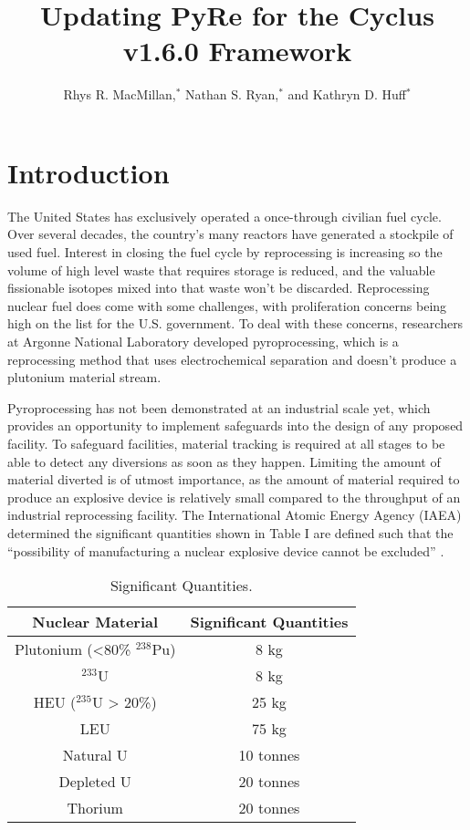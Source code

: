 \documentclass{anstrans}
\title{Updating PyRe for the Cyclus v1.6.0 Framework}
\author{Rhys R. MacMillan,$^{*}$ Nathan S. Ryan,$^{*}$ and Kathryn D. Huff$^{*}$}
\institute{
$^{*}$Advanced Reactors and Fuel Cycles Group, University of Illinois, Urbana IL, rhysrm2@illinois.edu
}
\begin{document}
\section{Introduction}
The United States has exclusively operated a once-through civilian fuel cycle. 
Over several decades, the country’s many reactors have generated a stockpile of used fuel. Interest in closing the fuel cycle by reprocessing is increasing so the volume of high level waste that requires storage is reduced, and the valuable fissionable isotopes mixed into that waste won’t be discarded. Reprocessing nuclear fuel does come with some challenges, with proliferation concerns being high on the list for the U.S. government. To deal with these concerns, researchers at Argonne National Laboratory developed pyroprocessing, which is a reprocessing method that uses electrochemical separation and doesn’t produce a plutonium material stream. 

Pyroprocessing has not been demonstrated at an industrial scale yet, which provides an opportunity to implement safeguards into the design of any proposed facility. To safeguard facilities, material tracking is required at all stages to be able to detect any diversions as soon as they happen. Limiting the amount of material diverted is of utmost importance, as the amount of material required to produce an explosive device is relatively small compared to the throughput of an industrial reprocessing facility. The International Atomic Energy Agency (IAEA) determined the significant quantities shown in Table I are defined such that the “possibility of manufacturing a nuclear explosive device cannot be excluded” \cite{schanfein_iaea_2021}.

\begin{table}[H]
  \centering
  \caption{Significant Quantities.}
  \label{tab:sig_quant}
  \begin{tabular}{c c}
    \hline
    Nuclear Material&Significant Quantities\\
    \hline
    Plutonium (<80\% $^{238}$Pu)&8 kg\\
    $^{233}$U&8 kg\\
    HEU ($^{235}$U > 20\%)&25 kg\\
    LEU&75 kg\\
    Natural U&10 tonnes\\
    Depleted U&20 tonnes\\
    Thorium&20 tonnes\\
    \hline
  \end{tabular}
\end{table}
\end{document}

